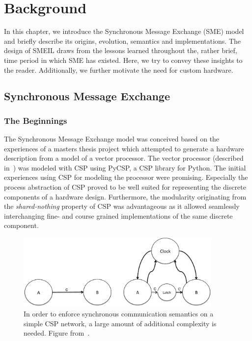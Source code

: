 \chapter{Background}
In this chapter, we introduce the Synchronous Message Exchange (SME) model and
briefly describe its origins, evolution, semantics and implementations. The
design of SMEIL draws from the lessons learned throughout the, rather brief,
time period in which SME has existed. Here, we try to convey these insights to
the reader. Additionally, we further motivate the need for custom hardware.

\section{Synchronous Message Exchange}
\label{sec:sme}

\subsection{The Beginnings}
The Synchronous Message Exchange model was conceived based on the experiences of
a masters thesis project \cite{Skaarup14} which attempted to generate a hardware
description from a model of a vector processor. The vector processor (described
in~\cite{rehr2013bpu}) was modeled with CSP using PyCSP, a CSP library for
Python. The initial experiences using CSP for modeling the processor were
promising. Especially the process abstraction of CSP proved to be well suited
for representing the discrete components of a hardware design. Furthermore, the
modularity originating from the {\itshape shared-nothing} property of CSP was
advantageous as it allowed seamlessly interchanging fine- and course grained
implementations of the same discrete component.

\begin{figure}
  \centering
  \includegraphics[width=0.9\textwidth]{figures/clocked.pdf}
  \caption{In order to enforce synchronous communication semantics on a simple
    CSP network, a large amount of additional complexity is needed. Figure
    from~\cite{vinter2014synchronous}.}
  \label{fig:clocked}
\end{figure}

